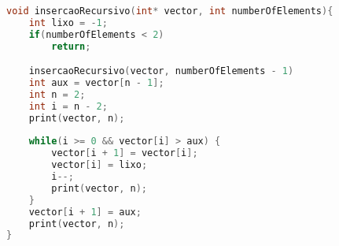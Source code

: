\begin{lstlisting}[language=C]
void insercaoRecursivo(int* vector, int numberOfElements){
    int lixo = -1;
    if(numberOfElements < 2)
        return;

    insercaoRecursivo(vector, numberOfElements - 1)
    int aux = vector[n - 1];
    int n = 2;
    int i = n - 2;
    print(vector, n);
    
    while(i >= 0 && vector[i] > aux) {
        vector[i + 1] = vector[i];
        vector[i] = lixo;
        i--;
        print(vector, n);
    }
    vector[i + 1] = aux;
    print(vector, n);
}
\end{lstlisting}

